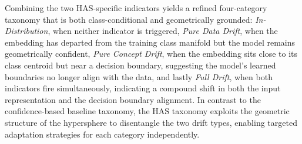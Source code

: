 Combining the two HAS-specific indicators yields a refined four-category taxonomy
that is both class-conditional and geometrically grounded:
\emph{In-Distribution}, when neither indicator is triggered,
\emph{Pure Data Drift}, when the embedding has departed from
the training class manifold but the model remains geometrically
confident, \emph{Pure Concept Drift}, when the embedding sits
close to its class centroid but near a decision boundary,
suggesting the model's learned boundaries no longer align with
the data, and lastly \emph{Full Drift}, when both indicators fire
simultaneously, indicating a compound shift in both the
input representation and the decision boundary alignment.
In contrast to the confidence-based baseline taxonomy, the HAS
taxonomy exploits the geometric structure of the hypersphere
to disentangle the two drift types, enabling targeted
adaptation strategies for each category independently.

